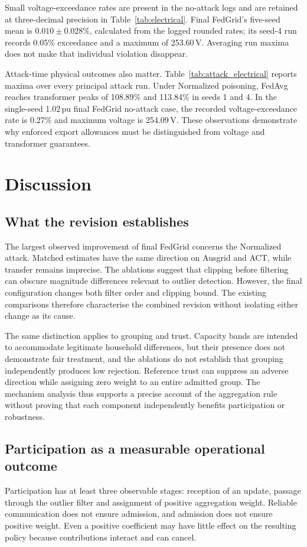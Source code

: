 \documentclass[preprint,12pt,a4paper]{elsarticle}
\begin{document}
Small voltage-exceedance rates are present in the no-attack logs and are retained at three-decimal precision in Table~\ref{tab:electrical}. Final FedGrid's five-seed mean is $0.010\pm0.028\%$, calculated from the logged rounded rates; its seed-4 run records 0.05\% exceedance and a maximum of 253.60\,V. Averaging run maxima does not make that individual violation disappear.

Attack-time physical outcomes also matter. Table~\ref{tab:attack_electrical} reports maxima over every principal attack run. Under Normalized poisoning, FedAvg reaches transformer peaks of 108.89\% and 113.84\% in seeds 1 and 4. In the single-seed 1.02\,pu final FedGrid no-attack case, the recorded voltage-exceedance rate is 0.27\% and maximum voltage is 254.09\,V. These observations demonstrate why enforced export allowances must be distinguished from voltage and transformer guarantees.



\section{Discussion}
\label{sec:discussion}
\subsection{What the revision establishes}
The largest observed improvement of final FedGrid concerns the Normalized attack. Matched estimates have the same direction on Ausgrid and ACT, while transfer remains imprecise. The ablations suggest that clipping before filtering can obscure magnitude differences relevant to outlier detection. However, the final configuration changes both filter order and clipping bound. The existing comparisons therefore characterise the combined revision without isolating either change as its cause.

The same distinction applies to grouping and trust. Capacity bands are intended to accommodate legitimate household differences, but their presence does not demonstrate fair treatment, and the ablations do not establish that grouping independently produces low rejection. Reference trust can suppress an adverse direction while assigning zero weight to an entire admitted group. The mechanism analysis thus supports a precise account of the aggregation rule without proving that each component independently benefits participation or robustness.

\subsection{Participation as a measurable operational outcome}
Participation has at least three observable stages: reception of an update, passage through the outlier filter and assignment of positive aggregation weight. Reliable communication does not ensure admission, and admission does not ensure positive weight. Even a positive coefficient may have little effect on the resulting policy because contributions interact and can cancel.
\end{document}
